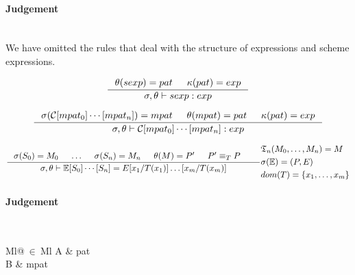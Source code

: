 

\paragraph{Judgement} \\

We have omitted the rules that deal with the structure of expressions and scheme
expressions.


\[
\inference
{
  \theta(sexp) = pat & \kappa(pat) = exp
}
{
  \sigma, \theta |- sexp : exp
}
\]

\[
\inference
{
  \sigma(\mathcal{C}[mpat_0]\cdots[mpat_n]) = mpat & \theta(mpat) = pat & \kappa(pat) = exp
}
{
  \sigma, \theta |- \mathcal{C}[mpat_0]\cdots[mpat_n] : exp
}
\]


\[
\inference
{
  \sigma(S_0) = M_0 & \ldots & \sigma(S_n) = M_n &
  \theta(M) = P' & P' \equiv_T P &
}
{
  \sigma, \theta |- \mathbb{E}[S_0]\cdots[S_n] = E[x_1/T(x_1)]\ldots[x_m/T(x_m)]
}
{
  \begin{aligned}
    & \mathfrak{T}_n(M_0, \ldots, M_n) = M\\
    & \sigma(\mathbb{E}) = (P, E)\\
    & dom(T) = \{x_1, \ldots, x_m\}
  \end{aligned}
}
\]

\clearpage

\paragraph{Judgement} \\
\indent\begin{tabular}{Ml@{$\ \in\ $}Ml}
  A & pat\\
  B & mpat
\end{tabular}

